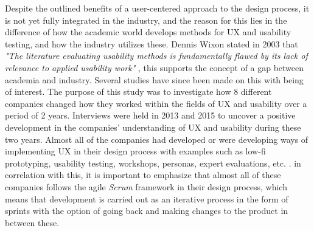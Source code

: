 \noindent
Despite the outlined benefits of a user-centered approach to the design process, it is not yet fully integrated in the industry, and the reason for this lies in the difference of how the academic world develops methods for UX and usability testing, and how the industry utilizes these. Dennis Wixon stated in 2003 that \textit{"The literature evaluating usability methods is fundamentally flawed by its lack of relevance to applied usability work"} \parencite{WEB:WixonUXindustry}, this supports the concept of a gap between academia and industry. Several studies have since been made on this with \textcite{WEB:TinaOgLarsBo} being of interest. The purpose of this study was to investigate how 8 different companies changed how they worked within the fields of UX and usability over a period of 2 years. Interviews were held in 2013 and 2015 to uncover a positive development in the companies' understanding of UX and usability during these two years. Almost all of the companies had developed or were developing ways of implementing UX in their design process with examples such as low-fi prototyping, usability testing, workshops, personas, expert evaluations, etc. \parencite[][48]{WEB:TinaOgLarsBo}. in correlation with this, it is important to emphasize that almost all of these companies follows the agile \textit{Scrum} framework in their design process, which means that development is carried out as an iterative process in the form of sprints with the option of going back and making changes to the product in between these.

